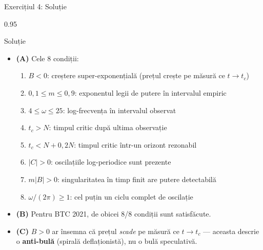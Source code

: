 \documentclass[9pt, aspectratio=169, t]{beamer}
\begin{document}
\begin{frame}{Exercițiul 4: Soluție}
    \begin{cminipage}{0.95\textwidth}
    \begin{exampleblock}{Soluție}
        {\scriptsize
        \begin{itemize}\setlength{\itemsep}{2pt}
            \item \textcolor{MainBlue}{\textbf{(A)}} Cele 8 condiții:
            \begin{enumerate}\setlength{\itemsep}{0pt}
                \item $B < 0$: creștere super-exponențială (prețul crește pe măsură ce $t \to t_c$)
                \item $0{,}1 \leq m \leq 0{,}9$: exponentul legii de putere în intervalul empiric
                \item $4 \leq \omega \leq 25$: log-frecvența în intervalul observat
                \item $t_c > N$: timpul critic după ultima observație
                \item $t_c < N + 0{,}2N$: timpul critic într-un orizont rezonabil
                \item $|C| > 0$: oscilațiile log-periodice sunt prezente
                \item $m|B| > 0$: singularitatea în timp finit are putere detectabilă
                \item $\omega / (2\pi) \geq 1$: cel puțin un ciclu complet de oscilație
            \end{enumerate}
            \item \textcolor{MainBlue}{\textbf{(B)}} Pentru BTC 2021, de obicei 8/8 condiții sunt satisfăcute.
            \item \textcolor{MainBlue}{\textbf{(C)}} $B > 0$ ar însemna că prețul \emph{scade} pe măsură ce $t \to t_c$ --- aceasta descrie o \textbf{anti-bulă} (spirală deflaționistă), nu o bulă speculativă.
        \end{itemize}
        }
    \end{exampleblock}
    \end{cminipage}
\end{frame}
\end{document}
